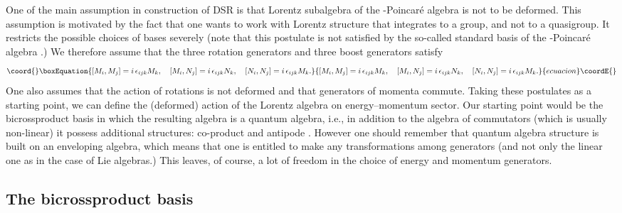 \documentclass[a4paper,a4paper]{article}
\begin{document}
One of the main assumption in construction of DSR is that Lorentz
subalgebra of the \myHighlight{$\kappa$}\coordHE{}-Poincar\'e algebra is  not to be
deformed. This assumption is motivated by the fact that one wants
to work with Lorentz structure that integrates to a group, and not
to a quasigroup. It restricts the possible choices of bases
severely (note that this postulate is not satisfied by the
so-called standard basis of the \myHighlight{$\kappa$}\coordHE{}-Poincar\'e algebra
\cite{lunoruto}.) We therefore assume that the three rotation
generators \coordHE{} and three boost generators \coordHE{} satisfy
\begin{equation}\coord{}\boxEquation{\label{1}
 [M_i, M_j] = i\, \epsilon_{ijk} M_k, \quad [M_i, N_j] = i\, \epsilon_{ijk} N_k,
 \quad [N_i, N_j] = i\, \epsilon_{ijk} M_k.
}{[M_i, M_j] = i\, \epsilon_{ijk} M_k, \quad [M_i, N_j] = i\, \epsilon_{ijk} N_k,
 \quad [N_i, N_j] = i\, \epsilon_{ijk} M_k.
}{ecuacion}\coordE{}\end{equation}
One  also assumes that the action of rotations is not deformed and
that generators of momenta commute. Taking these  postulates as a
starting point, we can define the (deformed) action of the Lorentz
algebra on energy--momentum sector. Our starting point would be
the bicrossproduct basis in which the resulting algebra is a
quantum algebra, i.e., in addition to the algebra of commutators
(which is usually non-linear)  it possess additional structures:
co-product \myHighlight{$\Delta$}\coordHE{} and antipode \coordHE{}. However one should remember
that quantum algebra structure is built on an enveloping algebra,
which means that one is entitled to make any transformations among
generators (and not only the linear one as in the case of Lie
algebras.) This leaves, of course, a lot of freedom in the choice
of energy and momentum generators.

\subsection{The bicrossproduct basis}
\end{document}
